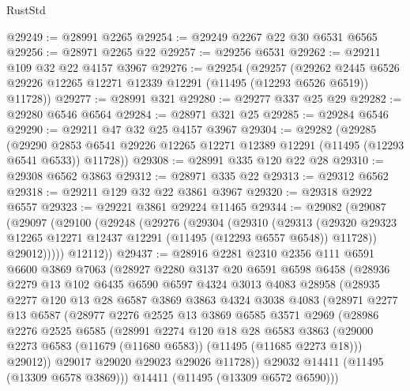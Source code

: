 \begin{lexlean}{RustStd}
\begin{coremodule}
@29249 := @28991 @2265
@29254 := @29249 @2267 @22 @30 @6531 @6565
@29256 := @28971 @2265 @22
@29257 := @29256 @6531
@29262 := @29211 @109 @32 @22 @4157 @3967
@29276 := @29254
    (@29257
      (@29262 @2445 @6526 @29226 @12265 @12271 @12339 @12291 (@11495 (@12293 @6526 @6519)) @11728))
@29277 := @28991 @321
@29280 := @29277 @337 @25 @29
@29282 := @29280 @6546 @6564
@29284 := @28971 @321 @25
@29285 := @29284 @6546
@29290 := @29211 @47 @32 @25 @4157 @3967
@29304 := @29282
    (@29285
      (@29290 @2853 @6541 @29226 @12265 @12271 @12389 @12291 (@11495 (@12293 @6541 @6533)) @11728))
@29308 := @28991 @335 @120 @22 @28
@29310 := @29308 @6562 @3863
@29312 := @28971 @335 @22
@29313 := @29312 @6562
@29318 := @29211 @129 @32 @22 @3861 @3967
@29320 := @29318 @2922 @6557
@29323 := @29221 @3861 @29224 @11465
@29344 := @29082
    (@29087
      (@29097
        (@29100
          (@29248
            (@29276
              (@29304
                (@29310
                  (@29313
                    (@29320
                      @29323
                      @12265
                      @12271
                      @12437
                      @12291
                      (@11495 (@12293 @6557 @6548))
                      @11728))
                  @29012)))))
        @12112))
@29437 := @28916
    @2281
    @2310
    @2356
    @111
    @6591
    @6600
    @3869
    @7063
    (@28927
      @2280
      @3137
      @20
      @6591
      @6598
      @6458
      (@28936
        @2279
        @13
        @102
        @6435
        @6590
        @6597
        @4324
        @3013
        @4083
        @28958
        (@28935
          @2277
          @120
          @13
          @28
          @6587
          @3869
          @3863
          @4324
          @3038
          @4083
          (@28971
            @2277
            @13
            @6587
            (@28977
              @2276
              @2525
              @13
              @3869
              @6585
              @3571
              @2969
              (@28986
                @2276
                @2525
                @6585
                (@28991
                  @2274
                  @120
                  @18
                  @28
                  @6583
                  @3863
                  (@29000 @2273 @6583 (@11679 (@11680 @6583)) (@11495 (@11685 @2273 @18)))
                  @29012))
              @29017
              @29020
              @29023
              @29026
              @11728))
          @29032
          @14411
          (@11495 (@13309 @6578 @3869)))
        @14411
        (@11495 (@13309 @6572 @6590)))

\end{coremodule}
\end{lexlean}
